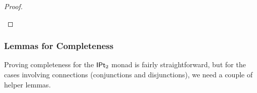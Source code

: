 \documentclass[a4paper]{memoir}
\begin{document}
\begin{proof}
\begin{itemize}
%		
	\end{itemize}
\end{proof}

\subsubsection{Lemmas for Completeness}
Proving completeness for the ${\mathsf{IPt}_2}$ monad is fairly straightforward,
but for the cases involving connections (conjunctions and disjunctions), we need a couple of helper lemmas.
\end{document}

